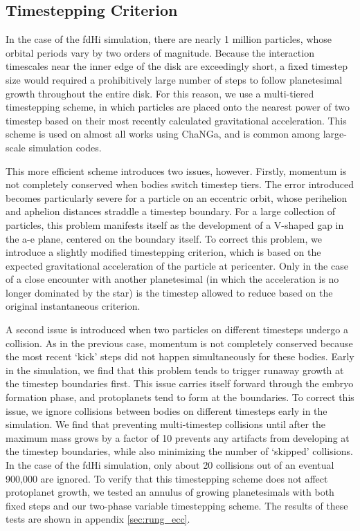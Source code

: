 \documentclass[twocolumn,linenumbers]{aastex63}
\begin{document}
\subsection{Timestepping Criterion}

In the case of the fdHi simulation, there are nearly 1 million
particles, whose orbital periods vary by two orders of magnitude. Because the
interaction timescales near the inner edge of the
disk are exceedingly short, a fixed timestep size would required a prohibitively large
number of steps to follow planetesimal growth throughout the entire
disk. For this reason, we use a multi-tiered timestepping scheme, in
which particles are placed onto the nearest power of two timestep
based on their most recently calculated gravitational
acceleration. This scheme is used on almost all works using ChaNGa,
and is common among large-scale simulation codes.

This more efficient scheme introduces two issues, however. Firstly,
momentum is not completely conserved when bodies switch timestep tiers. The
error introduced becomes particularly severe for a particle on an
eccentric orbit, whose perihelion and aphelion distances
straddle a timestep boundary. For a large collection of particles,
this problem manifests itself as the development of a V-shaped gap in the a-e plane, centered on the boundary itself. To correct this problem, we introduce a slightly modified timestepping criterion, which is based on the expected gravitational acceleration of the particle at pericenter. Only in the case of a close encounter with another planetesimal (in which the acceleration is no longer dominated by the star) is the timestep allowed to reduce based on the original instantaneous criterion.

A second issue is introduced when two particles on different timesteps
undergo a collision. As in the previous case, momentum is not
completely conserved because the most recent `kick' steps did not
happen simultaneously for these bodies. Early in the simulation, we
find that this problem tends to trigger runaway growth at the timestep
boundaries first. This issue carries itself forward through the embryo
formation phase, and protoplanets tend to form at the boundaries. To
correct this issue, we ignore collisions between bodies on different
timesteps early in the simulation. We find that preventing
multi-timestep collisions until after the maximum mass grows by a
factor of 10 prevents any artifacts from developing at the timestep
boundaries, while also minimizing the number of `skipped' collisions. In the case of the fdHi simulation, only about 20 collisions out of an eventual 900,000 are ignored. To verify that this timestepping scheme does not affect protoplanet growth, we tested an annulus of growing planetesimals with both fixed steps and our two-phase variable timestepping scheme. The results of these tests are shown in appendix \ref{sec:rung_ecc}.
\end{document}
